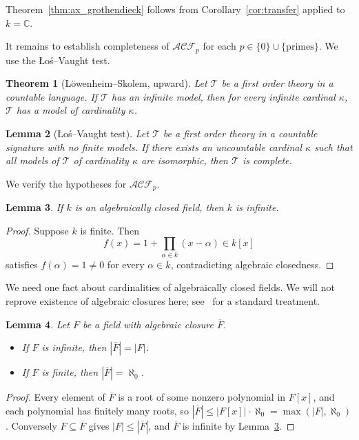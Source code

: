 \documentclass[12pt]{article}
\theoremstyle{plain}
\newtheorem{thm}{Theorem}[subsection]
\newtheorem{lemma}[thm]{Lemma}
\theoremstyle{definition}
\newcommand{\bb}[1]{\mathbb{#1}}
\newcommand{\call}[1]{\mathcal{#1}}
\begin{document}
Theorem~\ref{thm:ax_grothendieck} follows from Corollary~\ref{cor:transfer} applied to $k = \bb{C}$.

It remains to establish completeness of $\call{ACF}_p$ for each $p \in \{0\} \cup \{\text{primes}\}$. We use the {\L}o\'s--Vaught test.

\begin{thm}[L\"owenheim--Skolem, upward]\label{thm:loweheim_skolem}
Let $\call{T}$ be a first order theory in a countable language. If $\call{T}$ has an infinite model, then for every infinite cardinal $\kappa$, $\call{T}$ has a model of cardinality $\kappa$.
\end{thm}

\begin{lemma}[{\L}o\'s--Vaught test]\label{lem:los_vaught}
Let $\call{T}$ be a first order theory in a countable signature with no finite models. If there exists an uncountable cardinal $\kappa$ such that all models of $\call{T}$ of cardinality $\kappa$ are isomorphic, then $\call{T}$ is complete.
\end{lemma}

We verify the hypotheses for $\call{ACF}_p$.

\begin{lemma}\label{lem:no_finite_models}
If $k$ is an algebraically closed field, then $k$ is infinite.
\end{lemma}
\begin{proof}
Suppose $k$ is finite. Then
\[
f(x) = 1 + \prod_{\alpha \in k}(x - \alpha) \in k[x]
\]
satisfies $f(\alpha) = 1 \neq 0$ for every $\alpha \in k$, contradicting algebraic closedness.
\end{proof}

We need one fact about cardinalities of algebraically closed fields. We will not reprove existence of algebraic closures here; see~\cite{Lang} for a standard treatment.

\begin{lemma}\label{lem:cardinality}
Let $F$ be a field with algebraic closure $\overline{F}$.
\begin{itemize}
\item If $F$ is infinite, then $|\overline{F}| = |F|$.
\item If $F$ is finite, then $|\overline{F}| = \aleph_0$.
\end{itemize}
\end{lemma}
\begin{proof}
Every element of $\overline{F}$ is a root of some nonzero polynomial in $F[x]$, and each polynomial has finitely many roots, so $|\overline{F}| \leq |F[x]| \cdot \aleph_0 = \max(|F|,\aleph_0)$. Conversely $F \subseteq \overline{F}$ gives $|F| \leq |\overline{F}|$, and $\overline{F}$ is infinite by Lemma~\ref{lem:no_finite_models}.
\end{proof}
\end{document}
